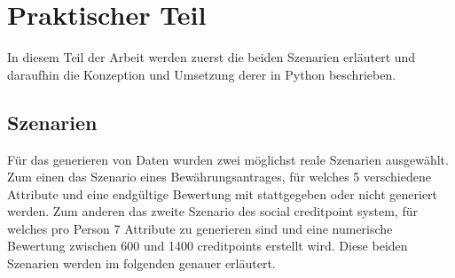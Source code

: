 \chapter{Praktischer Teil}
\label{sec:praktischerteil}
\begin{onehalfspace}
In diesem Teil der Arbeit werden zuerst die beiden Szenarien erläutert und daraufhin die Konzeption und Umsetzung derer in Python beschrieben.
\section{Szenarien}
\label{subsec:szenarien}
Für das generieren von Daten wurden zwei möglichst reale Szenarien ausgewählt. Zum einen das Szenario eines Bewährungsantrages, für welches 5 verschiedene Attribute und eine endgültige Bewertung mit stattgegeben oder nicht generiert werden. Zum anderen das zweite Szenario des social creditpoint system, für welches pro Person 7 Attribute zu generieren sind und eine numerische Bewertung zwischen 600 und 1400 creditpoints erstellt wird. Diese beiden Szenarien werden im folgenden genauer erläutert.

\end{onehalfspace}
